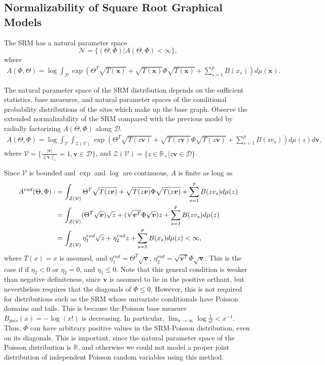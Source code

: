 \documentclass{samkoelleprelimworking}
\begin{document}
\subsection{Normalizability of Square Root Graphical Models}

The SRM has a natural parameter space
\[\mathcal{N} = \{ ( \Theta, \Phi)  \vert A(\Theta, \Phi) < \infty \} , \]
where
\begin{align}
A(\Phi, \Theta) = \log \int_\mathcal{D} \exp{(\Theta^T \sqrt{T(\bm{x})} +  \sqrt{T(\bm{x})} \Phi \sqrt{T(\bm{x})} + \sum_{s=1}^p B(x_s))}d\mu (\bm{x}).
\end{align}

The natural parameter space of the SRM distribution depends on the sufficient statistics, base measures, and natural parameter spaces of the conditional probability distributions of the sites which make up the base graph.  Observe the extended normalizability of the SRM compared with the previous model by radially factorizing $A(\Theta, \Phi ) $ along $\mathcal{D}$.
\begin{align}
A(\Theta , \Phi) = \log \int_\mathcal{V} \int_{\mathcal{Z}(\mathcal{V})} \exp{(\Theta^T \sqrt{T(z \bm{v})} +  \sqrt{T(z \bm{v})} \Phi \sqrt{T(z \bm{v})} + \sum_{s=1}^p B(zv_s))} d\mu(z)d\bm{v},
\end{align}
where $\mathcal{V} =\{\frac{\vert \bm{v} \vert}{  \|\bm{v}\|_1} = 1, \bm{v} \in \mathcal{D} \}$, and $\mathcal{Z}(\mathcal{V}) = \{z \in \mathbb{R}_+ \vert z\bm{v} \in \mathcal{D} \}$.

Since $\mathcal{V}$ is bounded and $\exp$ and $\log$ are continuous, $A$ is finite as long as
 \begin{align*}
 A^{rad}(\Theta, \Phi) \vcentcolon & = \int_{\mathcal{Z}(\mathcal{V})} \Theta^T \sqrt{T(z \bm{v})} +  \sqrt{T(z \bm{v})} \Phi \sqrt{T(z \bm{v})} + \sum_{s=1}^p B(zv_s) d\mu(z)\\
 &= \int_{\mathcal{Z}(\mathcal{V})}  (\Theta^T \sqrt{\bm{v}}) \sqrt{z} +  (\sqrt{\bm{v}^T} \Phi \sqrt{\bm{v}})z  + \sum_{s=1}^p B(zv_s)d\mu(z)\\
&= \int_{\mathcal{Z}(\mathcal{V})} \eta_{1}^{rad} \sqrt{z} + \eta_{2}^{rad} z + \sum_{s=1}^p B(x_s) d\mu(z) < \infty, 
\end{align*}
where $T(x) = x$ is assumed, and $\eta_{1}^{rad} = \Theta^T \sqrt{\bm{v}}$,  $\eta_{2}^{rad} = \sqrt{\bm{v}^T} \Phi \sqrt{\bm{v}}$.  This is the case if 
 if $\eta_2 < 0$ or $\eta_2 = 0$, and $\eta_1 \leq 0$.  Note that this general condition is weaker than negative definiteness, since $\bm{v}$ is assumed to lie in the positive orthant, but nevertheless requires that the diagonals of $\Phi \leq 0$.  However, this is not required for distributions such as the SRM whose univariate conditionals have Poisson domains and tails.  This is because the Poisson base measure $B_{\textit{pois}}(x) = - \log (x!)$ is decreasing.  In particular, $\lim_{x \to \infty} \log \frac{1}{x!} < x^{-1}.$  Thus, $\Phi$ can have arbitrary positive values in the SRM-Poisson distribution, even on its diagonals.  This is important, since the natural parameter space of the Poisson distribution is $\mathbb{R}$, and otherwise we could not model a proper joint distribution of independent Poisson random variables using this method.
\end{document}
